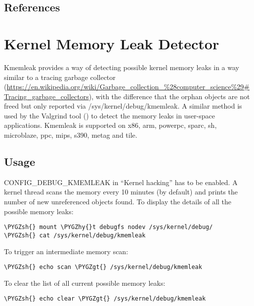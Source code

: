\documentclass[a4paper,8pt,english]{sphinxmanual}
\def\PYGZgt{\char`\>}
\def\PYGZsh{\char`\#}
\def\PYGZhy{\char`\-}
\begin{document}
\section{References}
\label{dev-tools/ubsan:references}

\chapter{Kernel Memory Leak Detector}
\label{dev-tools/kmemleak:kernel-memory-leak-detector}\label{dev-tools/kmemleak:id2}\label{dev-tools/kmemleak::doc}
Kmemleak provides a way of detecting possible kernel memory leaks in a
way similar to a tracing garbage collector
(\url{https://en.wikipedia.org/wiki/Garbage\_collection\_\%28computer\_science\%29\#Tracing\_garbage\_collectors}),
with the difference that the orphan objects are not freed but only
reported via /sys/kernel/debug/kmemleak. A similar method is used by the
Valgrind tool () to detect the memory leaks in
user-space applications.
Kmemleak is supported on x86, arm, powerpc, sparc, sh, microblaze, ppc, mips, s390, metag and tile.


\section{Usage}
\label{dev-tools/kmemleak:usage}
CONFIG\_DEBUG\_KMEMLEAK in ``Kernel hacking'' has to be enabled. A kernel
thread scans the memory every 10 minutes (by default) and prints the
number of new unreferenced objects found. To display the details of all
the possible memory leaks:

\begin{Verbatim}[commandchars=\\\{\}]
\PYGZsh{} mount \PYGZhy{}t debugfs nodev /sys/kernel/debug/
\PYGZsh{} cat /sys/kernel/debug/kmemleak
\end{Verbatim}

To trigger an intermediate memory scan:

\begin{Verbatim}[commandchars=\\\{\}]
\PYGZsh{} echo scan \PYGZgt{} /sys/kernel/debug/kmemleak
\end{Verbatim}

To clear the list of all current possible memory leaks:

\begin{Verbatim}[commandchars=\\\{\}]
\PYGZsh{} echo clear \PYGZgt{} /sys/kernel/debug/kmemleak
\end{Verbatim}
\end{document}
